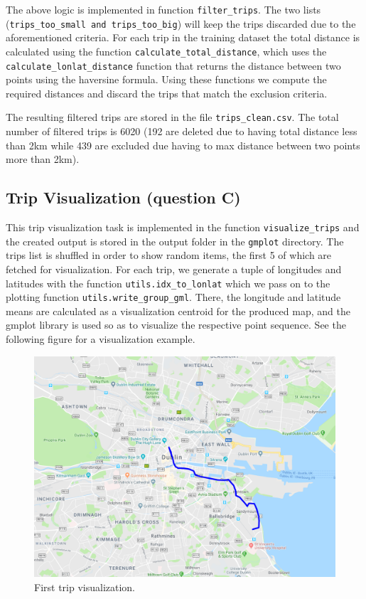 \documentclass[12pt]{article}
\begin{document}
	The above logic is implemented in function \texttt{filter\_trips}. The two
  lists (\texttt{trips\_too\_small and trips\_too\_big}) will keep the trips
  discarded due to the aforementioned criteria. For each trip in the training
  dataset the total distance is calculated using the function
  \texttt{calculate\_total\_distance}, which uses the
  \texttt{calculate\_lonlat\_distance} function that returns the distance
  between two points using the haversine formula. Using these functions we
  compute the required distances and discard the trips that match the exclusion
  criteria.
	
	The resulting filtered trips are stored in the file \texttt{trips\_clean.csv}. The total number of filtered trips is 6020 (192 are deleted due to having total distance less than 2km while 439 are excluded due having to max distance between two points more than 2km).
	
	\subsection{Trip Visualization (question C)}
	This trip visualization task is implemented in the function
  \texttt{visualize\_trips} and the created output is stored in the output
  folder in the \texttt{gmplot} directory. The trips list is shuffled in order
  to show random items, the first 5 of which are fetched for
  visualization. For each trip, we generate a tuple of longitudes and latitudes
  with the function \texttt{utils.idx\_to\_lonlat} which we pass on to the
  plotting function \texttt{utils.write\_group\_gml}. There, the longitude and
  latitude means are calculated as a visualization centroid for the produced map, and the gmplot
  library is used so as to visualize the respective point sequence. See the
  following figure for a visualization example. 
	
	\begin{figure} [H]
		\begin{center}
			\includegraphics [scale = 0.55] {questionC1.png}
			\caption{First trip visualization.}
		\end{center}
    \label{gmlplot_example}
	\end{figure}
\end{document}
